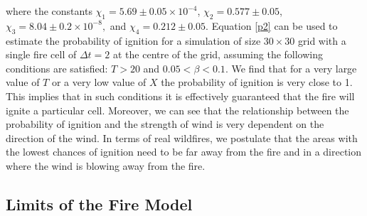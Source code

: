\noindent where the constants $\chi_1 = 5.69 \pm0.05\times 10^{-4}$, $\chi_2=0.577\pm 0.05$,$\chi_3=8.04\pm0.2\times 10^{-8},$ and $\chi_4=0.212\pm0.05$. Equation \ref{p2} can be used to estimate the probability of ignition for a simulation of size $30 \times 30$ grid with a single fire cell of $\Delta t=2$ at the centre of the grid, assuming the following conditions are satisfied: $T>20$ and $0.05<\beta<0.1$. \newline 
\indent We find that for a very large value of $T$ or a very low value of $X$ the probability of ignition is very close to 1. This implies that in such conditions it is effectively guaranteed that the fire will ignite a particular cell. Moreover, we can see that the relationship between the probability of ignition and the strength of wind is very dependent on the direction of the wind. In terms of real wildfires, we postulate that the areas with the lowest chances of ignition need to be far away from the fire and in a direction where the wind is blowing away from the fire.

\subsection{Limits of the Fire Model}\label{modellimits}

